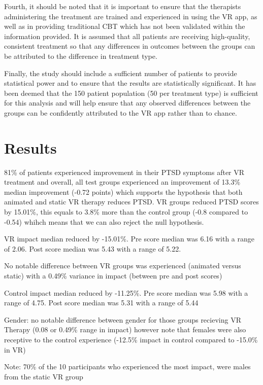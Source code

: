 \documentclass[
  10pt,
]{article}
\begin{document}
Fourth, it should be noted that it is important to ensure that the
therapists administering the treatment are trained and experienced in
using the VR app, as well as in providing traditional CBT which has not
been validated within the information provided. It is assumed that all
patients are receiving high-quality, consistent treatment so that any
differences in outcomes between the groups can be attributed to the
difference in treatment type.

Finally, the study should include a sufficient number of patients to
provide statistical power and to ensure that the results are
statistically significant. It has been deemed that the 150 patient
population (50 per treatment type) is sufficient for this analysis and
will help ensure that any observed differences between the groups can be
confidently attributed to the VR app rather than to chance.

\hypertarget{results}{%
\section{Results}\label{results}}

81\% of patients experienced improvement in their PTSD symptoms after VR
treatment and overall, all test groups experienced an improvement of
13.3\% median improvement (-0.72 points) which supports the hypothesis
that both animated and static VR therapy reduces PTSD. VR groups reduced
PTSD scores by 15.01\%, this equals to 3.8\% more than the control group
(-0.8 compared to -0.54) whihch means that we can also reject the null
hypothesis.

VR impact median reduced by -15.01\%. Pre score median was 6.16 with a
range of 2.06. Post score median was 5.43 with a range of 5.22.

No notable difference between VR groups was experienced (animated versus
static) with a 0.49\% variance in impact (between pre and post scores)

Control impact median reduced by -11.25\%. Pre score median was 5.98
with a range of 4.75. Post score median was 5.31 with a range of 5.44

Gender: no notable difference between gender for those groups recieving
VR Therapy (0.08 or 0.49\% range in impact) however note that females
were also receptive to the control experience (-12.5\% impact in control
compared to -15.0\% in VR)

Note: 70\% of the 10 participants who experienced the most impact, were
males from the static VR group
\end{document}
